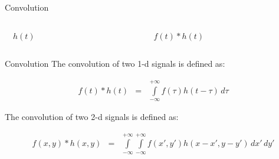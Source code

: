 \begin{frame}[t]{Convolution}
\begin{center}
{\begin{columns}[t, onlytextwidth]
\begin{column}{0.33\textwidth}
                    $\quad{}h(t)$
                \end{column}\begin{column}{0.33\textwidth}
                    \centering{}
                    \scalebox{0.4}{}

                    $\quad{}f(t) \ast h(t)$
                \end{column}
            \end{columns}}
    \end{center}

\end{frame}

\begin{frame}[t]{Convolution}
    The convolution of two 1-d signals is defined as:

    \begin{eqnarray*}
        f(t) \ast h(t) &=& \int\limits_{-\infty}^{+\infty}f\left(\tau\right)h\left(t-\tau\right) \, d\tau
    \end{eqnarray*}\newline

    The convolution of two 2-d signals is defined as:

    \begin{eqnarray*}
        f\left(x,y\right) \ast h\left(x,y\right) &=& \int\limits_{-\infty}^{+\infty}\int\limits_{-\infty}^{+\infty}f\left(x',y'\right)h\left(x-x',y-y'\right) \, dx' \, dy'
    \end{eqnarray*}


\end{frame}

